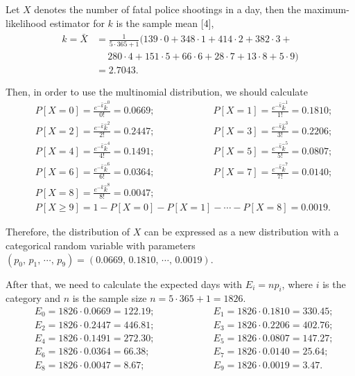 \documentclass[a4paper]{article}
\begin{document}
	Let $X$ denotes the number of fatal police shootings in a day, then the maximum-likelihood estimator for $k$ is the sample mean [4], 
\begin{equation}
\begin{split}
\hat{k}=\bar{X}&= \frac{1}{5\cdot365+1} (139\cdot0+348\cdot1+414\cdot2+382\cdot3+ \\  & \quad \   280\cdot4+151\cdot5+66\cdot6+28\cdot7+13\cdot8+5\cdot9) \\
&=2.7043.
\nonumber
\end{split}
\end{equation}

	Then, in order to use the multinomial distribution, we should calculate 
\begin{equation}
\begin{split}
&P[X=0]=\frac{e^{-\hat{k}}{\hat{k}}^0}{0!}=0.0669; \qquad \qquad \qquad P[X=1]=\frac{e^{-\hat{k}}{\hat{k}}^1}{1!}=0.1810;  \\
&P[X=2]=\frac{e^{-\hat{k}}{\hat{k}}^2}{2!}=0.2447; \qquad \qquad \qquad P[X=3]=\frac{e^{-\hat{k}}{\hat{k}}^3}{3!}=0.2206;  \\
&P[X=4]=\frac{e^{-\hat{k}}{\hat{k}}^4}{4!}=0.1491; \qquad \qquad \qquad P[X=5]=\frac{e^{-\hat{k}}{\hat{k}}^5}{5!}=0.0807;  \\
&P[X=6]=\frac{e^{-\hat{k}}{\hat{k}}^6}{6!}=0.0364; \qquad \qquad \qquad P[X=7]=\frac{e^{-\hat{k}}{\hat{k}}^7}{7!}=0.0140;  \\
&P[X=8]=\frac{e^{-\hat{k}}{\hat{k}}^8}{8!}=0.0047;\\
&P[X\ge9]=1-P[X=0]-P[X=1]-\cdots-P[X=8]=0.0019.
\nonumber
\end{split}
\end{equation}

	Therefore, the distribution of $X$ can be expressed as a new distribution with a categorical random variable with parameters $(p_0,\,p_1,\,\cdots,\,p_9)=(0.0669,\, 0.1810,\,\cdots,\,0.0019)$.

	After that, we need to calculate the expected days with $E_i=np_i$, where $i$ is the category and $n$ is the sample size $n=5\cdot365+1=1826$.
\begin{equation}
\begin{split}
&E_0=1826\cdot0.0669=122.19; \qquad \qquad \qquad E_1=1826\cdot0.1810=330.45;  \\
&E_2=1826\cdot0.2447=446.81; \qquad \qquad \qquad E_3=1826\cdot0.2206=402.76;  \\
&E_4=1826\cdot0.1491=272.30; \qquad \qquad \qquad E_5=1826\cdot0.0807=147.27;  \\
&E_6=1826\cdot0.0364=66.38; \qquad \qquad \qquad \,\, \, E_7=1826\cdot0.0140=25.64;  \\
&E_8=1826\cdot0.0047=8.67; \qquad \qquad \qquad\,\, \,\,\, \, E_9=1826\cdot0.0019=3.47.
\nonumber
\end{split}
\end{equation}
\end{document}
